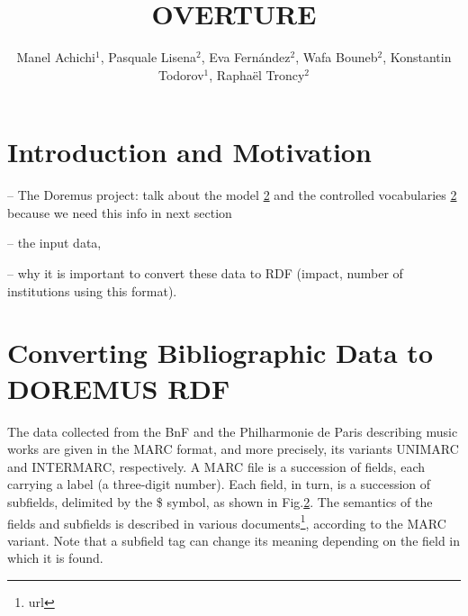 \documentclass[runningheads,a4paper]{llncs}
\begin{document}
\title{OVERTURE}


\author{Manel Achichi$^1$, Pasquale Lisena$^2$, Eva Fern\'{a}ndez$^2$, Wafa Bouneb$^2$, Konstantin Todorov$^1$, Rapha\"{e}l Troncy$^2$}

\maketitle


\begin{abstract}

\end{abstract}


\section{Introduction and Motivation}

-- The Doremus project: talk about the model \ref{} and the controlled vocabularies \ref{} because we need this info in next section

-- the input data, 

-- why it is important to convert these data to RDF (impact, number of institutions using this format).


\section{Converting Bibliographic Data to DOREMUS RDF}

The data collected from the BnF and the Philharmonie de Paris describing music works are given in the MARC format, and more precisely, its variants UNIMARC and INTERMARC, respectively. A MARC file is a succession of fields, each carrying a label (a three-digit number). Each field, in turn, is a succession of subfields, delimited by the \$ symbol, as shown in Fig.\ref{}. The semantics of the fields and subfields is described in various documents\footnote{url}, according to the MARC variant. Note that a subfield tag can change its meaning depending on the field in which it is found. 
\end{document}
